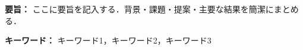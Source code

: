 \begin{minipage}{\textwidth}
\noindent\textbf{要旨：} ここに要旨を記入する．背景・課題・提案・主要な結果を簡潔にまとめる．

\vspace{1mm}
\noindent\textbf{キーワード：} キーワード1，キーワード2，キーワード3
\end{minipage}
